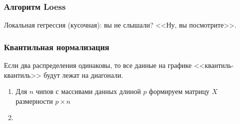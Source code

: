\documentclass[main.tex]{subfiles}
\begin{document}
\subsubsection{Алгоритм Loess}

Локальная гегрессия (кусочная): вы не слышали? <<Ну, вы посмотрите>>.

\subsubsection{Квантильная нормализация} %
Если два распределения одинаковы, то все данные на графике <<квантиль-квантиль>> будут лежат на диагонали.

\begin{enumerate}[noitemsep]
    \item Для $n$ чипов с массивами данных длиной $ p $ формируем матрицу $ X $ размерности $ p \times n $ %
    \item
\end{enumerate}
\end{document}
